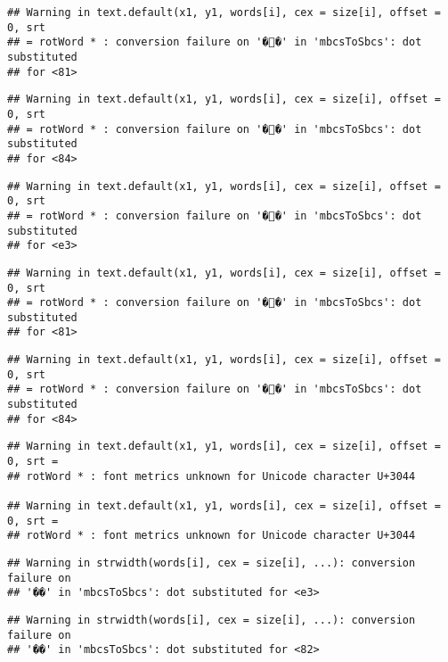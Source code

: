 \documentclass[]{article}
\begin{document}
\begin{verbatim}
## Warning in text.default(x1, y1, words[i], cex = size[i], offset = 0, srt
## = rotWord * : conversion failure on '��' in 'mbcsToSbcs': dot substituted
## for <81>
\end{verbatim}

\begin{verbatim}
## Warning in text.default(x1, y1, words[i], cex = size[i], offset = 0, srt
## = rotWord * : conversion failure on '��' in 'mbcsToSbcs': dot substituted
## for <84>
\end{verbatim}

\begin{verbatim}
## Warning in text.default(x1, y1, words[i], cex = size[i], offset = 0, srt
## = rotWord * : conversion failure on '��' in 'mbcsToSbcs': dot substituted
## for <e3>
\end{verbatim}

\begin{verbatim}
## Warning in text.default(x1, y1, words[i], cex = size[i], offset = 0, srt
## = rotWord * : conversion failure on '��' in 'mbcsToSbcs': dot substituted
## for <81>
\end{verbatim}

\begin{verbatim}
## Warning in text.default(x1, y1, words[i], cex = size[i], offset = 0, srt
## = rotWord * : conversion failure on '��' in 'mbcsToSbcs': dot substituted
## for <84>
\end{verbatim}

\begin{verbatim}
## Warning in text.default(x1, y1, words[i], cex = size[i], offset = 0, srt =
## rotWord * : font metrics unknown for Unicode character U+3044

## Warning in text.default(x1, y1, words[i], cex = size[i], offset = 0, srt =
## rotWord * : font metrics unknown for Unicode character U+3044
\end{verbatim}

\begin{verbatim}
## Warning in strwidth(words[i], cex = size[i], ...): conversion failure on
## '��' in 'mbcsToSbcs': dot substituted for <e3>
\end{verbatim}

\begin{verbatim}
## Warning in strwidth(words[i], cex = size[i], ...): conversion failure on
## '��' in 'mbcsToSbcs': dot substituted for <82>
\end{verbatim}
\end{document}
